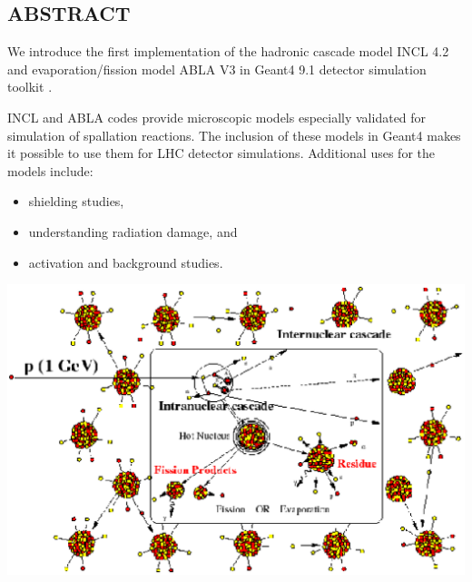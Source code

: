 \documentclass[20pt]{article}
\newenvironment{textbox}
{\begin{lrbox}{\dummybox}\begin{minipage}{0.9\columnwidth}}
{\end{minipage}\end{lrbox}\raisebox{-\depth}{\psshadowbox[framesep=1em,framearc=.1,shadow=true]{\usebox{\dummybox}}}\vspace{0.005\textheight}}
\begin{document}
\begin{center}
\begin{multicols}{3}
\begin{textbox}

\section*{{\Huge {\sf ABSTRACT}}}

We introduce the first implementation \cite{fp} of the hadronic cascade model {\sf INCL 4.2}
\cite{incl} and evaporation/fission model {\sf ABLA V3} \cite{abla} in {\sf Geant4 9.1} detector simulation toolkit \cite{g4}.
\vskip0.5cm

{\sf INCL} and {\sf ABLA} codes provide microscopic models especially validated for simulation of spallation reactions.  The
inclusion of these models in {\sf Geant4} makes it possible to use them
for LHC detector simulations. Additional uses for the models include:
\begin{itemize}
\item shielding studies,
\item understanding radiation damage, and
\item activation and background studies.
\end{itemize}

\end{textbox}

\hspace{-1cm} \includegraphics[scale=0.73]{images/cascade.eps}


\end{multicols}
\end{center}
\end{document}
